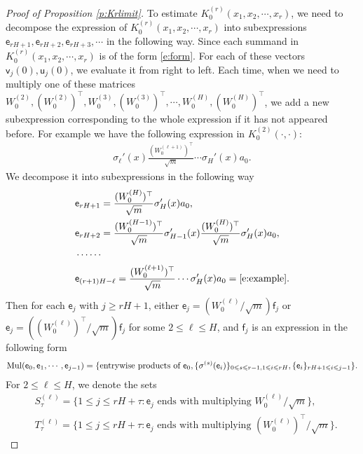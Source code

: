\documentclass{article}
\numberwithin{equation}{section}
\newcommand{\sfe}{{\mathsf e}}
\newcommand{\sff}{{\mathsf f}}
\newcommand{\sfv}{{\mathsf v}}
\newcommand{\sfu}{{\mathsf u}}
\renewcommand{\leq}{\leqslant}
\renewcommand{\geq}{\geqslant}
\newcommand{\1}{\mathds{1}}
\theoremstyle{plain} %
\newcommand{\Mul}{{\rm Mul}}
\begin{document}
\begin{proof}[Proof of Proposition \ref{p:Krlimit}]
To estimate $K^{(r)}_0(x_1,x_2,\cdots,x_r)$, we need to decompose the expression of $K^{(r)}_0(x_1,x_2,\cdots,x_r)$ into subexpressions $\sfe_{rH+1}, \sfe_{rH+2},\sfe_{rH+3},\cdots$ in the following way. Since each summand in $K^{(r)}_0(x_1,x_2,\cdots,x_r)$ is of the form \eqref{e:form}. For each of these vectors $\sfv_j(0), \sfu_j(0)$,
we evaluate it from right to left. Each time, when we need to multiply one of these matrices $W_0^{(2)}, (W_0^{(2)})^{\top},W_0^{(3)}, (W_0^{(3)})^{\top}, \cdots, W_0^{(H)},  (W_0^{(H)})^{\top}$, we add a new subexpression corresponding to the whole expression if it has not appeared before. For example we have the following expression in $K^{(2)}_0(\cdot,\cdot)$:
\begin{align}\label{e:example}
\sigma_\ell'(x)\frac{(W_0^{(\ell+1)})^\top}{\sqrt m}\cdots \sigma_H'(x)a_0.
\end{align}
We decompose it into subexpressions in the following way
\begin{align*}\begin{split}
&\sfe_{rH+1}=\frac{(W_0^{(H)})^\top}{\sqrt m}\sigma_H'(x)a_0,\\
&\sfe_{rH+2}=\frac{(W_0^{(H-1)})^\top}{\sqrt m}\sigma_{H-1}'(x)\frac{(W_0^{(H)})^\top}{\sqrt m}\sigma_H'(x)a_0,\\
&\cdots\cdots\\
&\sfe_{(r+1)H-\ell}=\frac{(W_0^{(\ell+1)})^\top}{\sqrt m}\cdots \sigma_H'(x)a_0=\eqref{e:example}.
\end{split}\end{align*}
Then for each $\sfe_j$ with $j\geq rH+1$, either $\sfe_j=(W_0^{(\ell)}/\sqrt{m})\sff_j$ or $\sfe_j=((W_0^{(\ell)})^\top/\sqrt{m})\sff_j$ for some $2\leq \ell\leq H$, and $\sff_j$ is an expression in the following form
\begin{align*}
\Mul(\sfe_0, \sfe_1,\cdots, \sfe_{j-1})=\{\text{entrywise products of } \sfe_0, \{\sigma^{(s)}(\sfe_i)\}_{0\leq s\leq r-1, 1\leq i\leq rH}, \{\sfe_i\}_{rH+1\leq i\leq j-1}\}.
\end{align*}
%
For $2\leq \ell\leq H$, we denote the sets
\begin{align*}
&S^{(\ell)}_\tau=\{1\leq j\leq rH+\tau: \sfe_j \text{ ends with multiplying } W_0^{(\ell)}/\sqrt m\},\\
&T^{(\ell)}_\tau=\{1\leq j\leq rH+\tau: \sfe_j \text{ ends with multiplying } (W_0^{(\ell)})^\top/\sqrt m\}.

\end{align*}
\end{proof}
\end{document}
